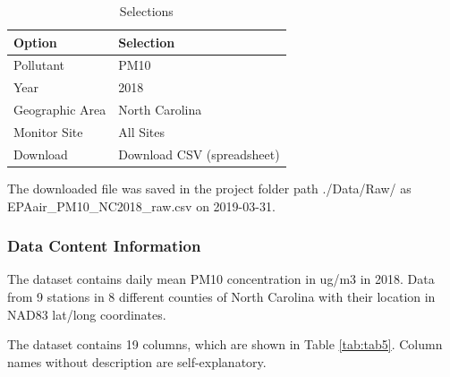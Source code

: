 \documentclass[12pt,]{article}
\begin{document}
\begin{table}[ht]
\centering
\begin{tabular}{ll}
  \hline
Option & Selection \\ 
  \hline
Pollutant & PM10 \\ 
  Year & 2018 \\ 
  Geographic Area & North Carolina \\ 
  Monitor Site & All Sites \\ 
  Download & Download CSV (spreadsheet) \\ 
   \hline
\end{tabular}
\caption{Selections} 
\label{tab:tab4}
\end{table}

The downloaded file was saved in the project folder path ./Data/Raw/ as
EPAair\_PM10\_NC2018\_raw.csv on 2019-03-31.

\subsubsection{Data Content
Information}\label{data-content-information-1}

The dataset contains daily mean PM10 concentration in ug/m3 in 2018.
Data from 9 stations in 8 different counties of North Carolina with
their location in NAD83 lat/long coordinates.

The dataset contains 19 columns, which are shown in Table
\ref{tab:tab5}. Column names without description are self-explanatory.
\end{document}

